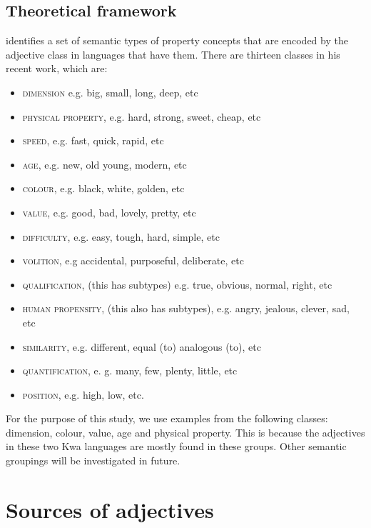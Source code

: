 \documentclass[output=paper,
modfonts
]{langscibook}
\begin{document}
\subsection{Theoretical framework}\label{sec:caesar:1.1} 

\citet{Dixon2004} identifies a set of semantic types of property concepts that are encoded by the adjective class in languages that have them. There are thirteen classes in his recent work, which are:


\begin{itemize}
\setlength\itemsep{0em}
 \item \textsc{dimension} e.g. big, small, long, deep, etc
 \item \textsc{physical property}, e.g. hard, strong, sweet, cheap, etc
 \item \textsc{speed}, e.g. fast, quick, rapid, etc
 \item \textsc{age}, e.g. new, old young, modern, etc
 \item \textsc{colour}, e.g. black, white, golden, etc
 \item \textsc{value}, e.g. good, bad, lovely, pretty, etc
 \item \textsc{difficulty}, e.g. easy, tough, hard, simple, etc
 \item \textsc{volition}, e.g accidental, purposeful, deliberate, etc
 \item \textsc{qualification}, (this has subtypes) e.g. true, obvious, normal, right, etc
 \item \textsc{human propensity}, (this also has subtypes), e.g. angry, jealous, clever, sad, etc
 \item \textsc{similarity}, e.g. different, equal (to) analogous (to), etc
 \item \textsc{quantification}, e. g. many, few, plenty, little, etc
 \item \textsc{position}, e.g. high, low, etc. 
\end{itemize}
 
 
For the purpose of this study, we use examples from the following classes: dimension, colour, value, age and physical property. This is because the adjectives in these two Kwa languages are mostly found in these groups. Other semantic groupings will be investigated in future.


\section{Sources of adjectives}\label{sec:caesar:1.3} 
\end{document}
